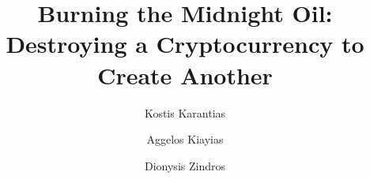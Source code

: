 \title{
Burning the Midnight Oil:\\
Destroying a Cryptocurrency to Create Another
}

\ifanonymous
   \author{}
   \institute{}
\else
   \author{
           Kostis Karantias  \and
           Aggelos Kiayias  \and
           Dionysis Zindros 
   }
\fi
\maketitle
